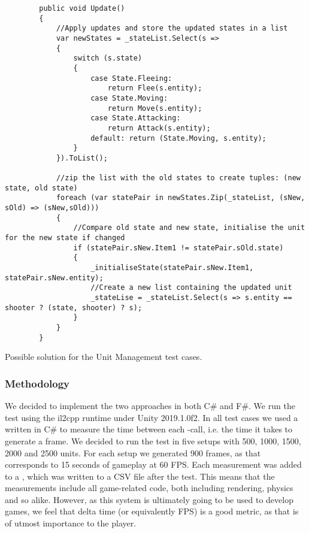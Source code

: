 \begin{listing}
    \begin{verbatim}
        public void Update()
        {
            //Apply updates and store the updated states in a list
            var newStates = _stateList.Select(s =>
            {
                switch (s.state)
                {
                    case State.Fleeing:
                        return Flee(s.entity);
                    case State.Moving:
                        return Move(s.entity);
                    case State.Attacking:
                        return Attack(s.entity);
                    default: return (State.Moving, s.entity);
                }
            }).ToList();

            //zip the list with the old states to create tuples: (new state, old state)
            foreach (var statePair in newStates.Zip(_stateList, (sNew, sOld) => (sNew,sOld)))
            {
                //Compare old state and new state, initialise the unit for the new state if changed
                if (statePair.sNew.Item1 != statePair.sOld.state)
                {
                    _initialiseState(statePair.sNew.Item1, statePair.sNew.entity);
                    //Create a new list containing the updated unit
                    _stateLise = _stateList.Select(s => s.entity == shooter ? (state, shooter) ? s);
                }
            }
        }
    \end{verbatim}
    \caption{Possible solution for the Unit Management test cases.}
    \label{lst:test:case:ai}
\end{listing}

\subsubsection{Methodology}
We decided to implement the two approaches in both C\# and F\#. We run the test using the il2cpp runtime under Unity 2019.1.0f2. In all test cases we used a  written in C\# to measure the time between each -call, i.e. the time it takes to generate a frame. We decided to run the test in five setups with 500, 1000, 1500, 2000 and 2500 units. For each setup we generated 900 frames, as that corresponds to 15 seconds of gameplay at 60 \gls{FPS}. Each measurement was added to a , which was written to a CSV file after the test. This means that the measurements include all game-related code, both including rendering, physics and so alike. However, as this system is ultimately going to be used to develop games, we feel that delta time (or equivalently \gls{FPS}) is a good metric, as that is of utmost importance to the player.

